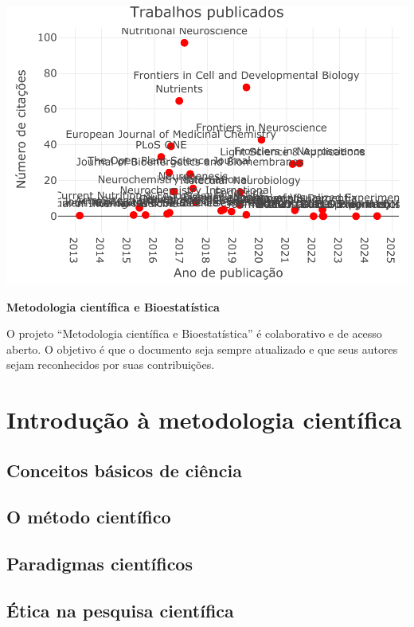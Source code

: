 \documentclass[
]{book}
\begin{document}
\includegraphics{MCBSbook_files/figure-latex/unnamed-chunk-1-1.pdf}

\textbf{Metodologia científica e Bioestatística}

O projeto ``Metodologia científica e Bioestatística'' é colaborativo e de acesso aberto. O objetivo é que o documento seja sempre atualizado e que seus autores sejam reconhecidos por suas contribuições.

\chapter{Introdução à metodologia científica}\label{introduuxe7uxe3o-uxe0-metodologia-cientuxedfica}

\section{Conceitos básicos de ciência}\label{conceitos-buxe1sicos-de-ciuxeancia}

\section{O método científico}\label{o-muxe9todo-cientuxedfico}

\section{Paradigmas científicos}\label{paradigmas-cientuxedficos}

\section{Ética na pesquisa científica}\label{uxe9tica-na-pesquisa-cientuxedfica}
\end{document}
